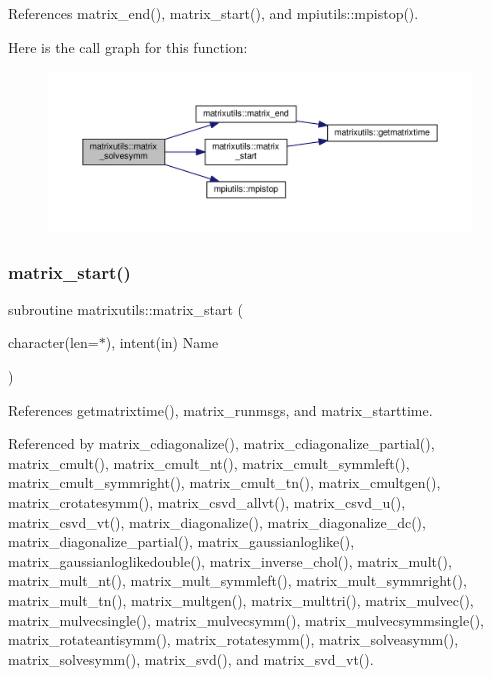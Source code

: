 References matrix\+\_\+end(), matrix\+\_\+start(), and mpiutils\+::mpistop().

Here is the call graph for this function\+:
\nopagebreak
\begin{figure}[H]
\begin{center}
\leavevmode
\includegraphics[width=350pt]{namespacematrixutils_afb220a70c7ec8bcc1eb1694588300540_cgraph}
\end{center}
\end{figure}
\mbox{\label{namespacematrixutils_a24fd4fc8dbd7eee3c9176c3f9ca634eb}} 
\subsubsection{\texorpdfstring{matrix\+\_\+start()}{matrix\_start()}}
{\footnotesize\ttfamily subroutine matrixutils\+::matrix\+\_\+start (\begin{DoxyParamCaption}\item[{character(len=$\ast$), intent(in)}]{Name }\end{DoxyParamCaption})}



References getmatrixtime(), matrix\+\_\+runmsgs, and matrix\+\_\+starttime.



Referenced by matrix\+\_\+cdiagonalize(), matrix\+\_\+cdiagonalize\+\_\+partial(), matrix\+\_\+cmult(), matrix\+\_\+cmult\+\_\+nt(), matrix\+\_\+cmult\+\_\+symmleft(), matrix\+\_\+cmult\+\_\+symmright(), matrix\+\_\+cmult\+\_\+tn(), matrix\+\_\+cmultgen(), matrix\+\_\+crotatesymm(), matrix\+\_\+csvd\+\_\+allvt(), matrix\+\_\+csvd\+\_\+u(), matrix\+\_\+csvd\+\_\+vt(), matrix\+\_\+diagonalize(), matrix\+\_\+diagonalize\+\_\+dc(), matrix\+\_\+diagonalize\+\_\+partial(), matrix\+\_\+gaussianloglike(), matrix\+\_\+gaussianloglikedouble(), matrix\+\_\+inverse\+\_\+chol(), matrix\+\_\+mult(), matrix\+\_\+mult\+\_\+nt(), matrix\+\_\+mult\+\_\+symmleft(), matrix\+\_\+mult\+\_\+symmright(), matrix\+\_\+mult\+\_\+tn(), matrix\+\_\+multgen(), matrix\+\_\+multtri(), matrix\+\_\+mulvec(), matrix\+\_\+mulvecsingle(), matrix\+\_\+mulvecsymm(), matrix\+\_\+mulvecsymmsingle(), matrix\+\_\+rotateantisymm(), matrix\+\_\+rotatesymm(), matrix\+\_\+solveasymm(), matrix\+\_\+solvesymm(), matrix\+\_\+svd(), and matrix\+\_\+svd\+\_\+vt().

